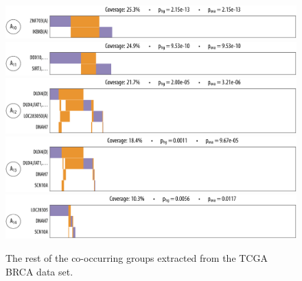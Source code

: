 \begin{figure}[htbp]
\centering
\includegraphics[width=\textwidth]{figures/genes/brca_10_a.pdf}\\[1.2em]
\includegraphics[width=\textwidth]{figures/genes/brca_12_a.pdf}\\[1.2em]
\includegraphics[width=\textwidth]{figures/genes/brca_3_a.pdf}\\[1.2em]
\includegraphics[width=\textwidth]{figures/genes/brca_2_a.pdf}\\[1.2em]
\includegraphics[width=\textwidth]{figures/genes/brca_6_a.pdf}\\[1.2em]
\caption{The rest of the co-occurring groups extracted from the TCGA BRCA data set.}
\label{fig:att_brca_3}
\end{figure}